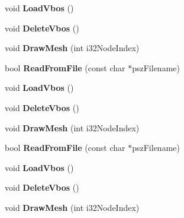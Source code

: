 \begin{DoxyCompactItemize}
\item 
\hypertarget{class_c_model_a84f8239483c19666955aa261a48cce0a}{void {\bfseries Load\+Vbos} ()}\label{class_c_model_a84f8239483c19666955aa261a48cce0a}

\item 
\hypertarget{class_c_model_a929575453dd8ffd5858188239143aca8}{void {\bfseries Delete\+Vbos} ()}\label{class_c_model_a929575453dd8ffd5858188239143aca8}

\item 
\hypertarget{class_c_model_a207c83bbf10a0bc60bc43852ed016b1b}{void {\bfseries Draw\+Mesh} (int i32\+Node\+Index)}\label{class_c_model_a207c83bbf10a0bc60bc43852ed016b1b}

\item 
\hypertarget{class_c_model_a5f378cb1e12f725e846a5dd5754aab36}{bool {\bfseries Read\+From\+File} (const char $\ast$psz\+Filename)}\label{class_c_model_a5f378cb1e12f725e846a5dd5754aab36}

\item 
\hypertarget{class_c_model_a84f8239483c19666955aa261a48cce0a}{void {\bfseries Load\+Vbos} ()}\label{class_c_model_a84f8239483c19666955aa261a48cce0a}

\item 
\hypertarget{class_c_model_a929575453dd8ffd5858188239143aca8}{void {\bfseries Delete\+Vbos} ()}\label{class_c_model_a929575453dd8ffd5858188239143aca8}

\item 
\hypertarget{class_c_model_a207c83bbf10a0bc60bc43852ed016b1b}{void {\bfseries Draw\+Mesh} (int i32\+Node\+Index)}\label{class_c_model_a207c83bbf10a0bc60bc43852ed016b1b}

\item 
\hypertarget{class_c_model_a5f378cb1e12f725e846a5dd5754aab36}{bool {\bfseries Read\+From\+File} (const char $\ast$psz\+Filename)}\label{class_c_model_a5f378cb1e12f725e846a5dd5754aab36}

\item 
\hypertarget{class_c_model_a84f8239483c19666955aa261a48cce0a}{void {\bfseries Load\+Vbos} ()}\label{class_c_model_a84f8239483c19666955aa261a48cce0a}

\item 
\hypertarget{class_c_model_a929575453dd8ffd5858188239143aca8}{void {\bfseries Delete\+Vbos} ()}\label{class_c_model_a929575453dd8ffd5858188239143aca8}

\item 
\hypertarget{class_c_model_a207c83bbf10a0bc60bc43852ed016b1b}{void {\bfseries Draw\+Mesh} (int i32\+Node\+Index)}\label{class_c_model_a207c83bbf10a0bc60bc43852ed016b1b}

\end{DoxyCompactItemize}

